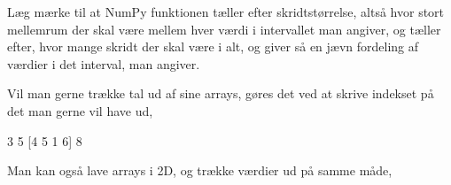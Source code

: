 \documentclass[letterpaper,10pt,english]{jupyterBook}
\begin{document}
\begin{sphinxVerbatim}[commandchars=\\\{\}]
[3 4 5 1]
[0.  0.5 1.  1.5 2.  2.5]
[0. 2. 4. 6. 8.]
\end{sphinxVerbatim}

Læg mærke til at NumPy funktionen  tæller efter skridtstørrelse, altså hvor stort mellemrum der skal være mellem hver værdi i intervallet man angiver, og  tæller efter, hvor mange skridt der skal være i alt, og giver så en jævn fordeling af værdier i det interval, man angiver.

Vil man gerne trække tal ud af sine arrays, gøres det ved at skrive indekset på det man gerne vil have ud,

\begin{sphinxVerbatim}[commandchars=\\\{\}]
  \PYG{p}{[}\PYG{p}{]} 

 \PYG{p}{[}\PYG{p}{]} \PYG{p}{[}\PYG{p}{]} 

\PYG{p}{[}\PYG{p}{]} 

\PYG{p}{[}\PYG{p}{]} 
\end{sphinxVerbatim}

\begin{sphinxVerbatim}[commandchars=\\\{\}]
[3 4 5 1 6 8]
3 5
[4 5 1 6]
8
\end{sphinxVerbatim}

Man kan også lave arrays i 2D, og trække værdier ud på samme måde,
\end{document}
